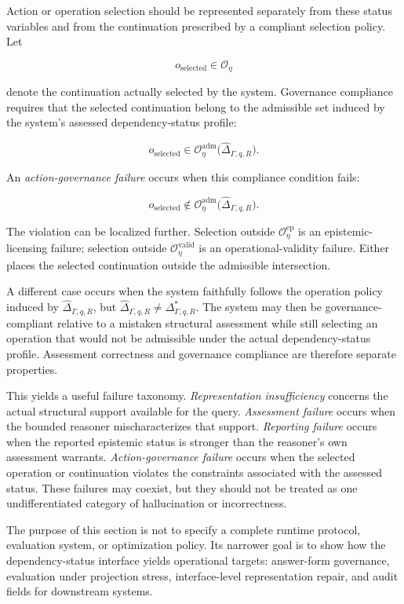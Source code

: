 \documentclass[11pt]{article}
\theoremstyle{definition}
\theoremstyle{remark}
\begin{document}
Action or operation selection should be represented separately from these status variables and from the continuation prescribed by a compliant selection policy. Let

\[
o_{\mathrm{selected}}\in\mathcal O_{\eta}
\]

denote the continuation actually selected by the system. Governance compliance requires that the selected continuation belong to the admissible set induced by the system's assessed dependency-status profile:

\[
o_{\mathrm{selected}}
\in
\mathcal O^{\mathrm{adm}}_{\eta}
\bigl(\widehat{\Delta}_{\Gamma,q,R}\bigr).
\]

An \emph{action-governance failure} occurs when this compliance condition fails:

\[
o_{\mathrm{selected}}
\notin
\mathcal O^{\mathrm{adm}}_{\eta}
\bigl(\widehat{\Delta}_{\Gamma,q,R}\bigr).
\]

The violation can be localized further. Selection outside \(\mathcal O^{\mathrm{ep}}_{\eta}\) is an epistemic-licensing failure; selection outside \(\mathcal O^{\mathrm{valid}}_{\eta}\) is an operational-validity failure. Either places the selected continuation outside the admissible intersection.

A different case occurs when the system faithfully follows the operation policy induced by \(\widehat{\Delta}_{\Gamma,q,R}\), but \(\widehat{\Delta}_{\Gamma,q,R}\neq\Delta^{*}_{\Gamma,q,R}\). The system may then be governance-compliant relative to a mistaken structural assessment while still selecting an operation that would not be admissible under the actual dependency-status profile. Assessment correctness and governance compliance are therefore separate properties.

This yields a useful failure taxonomy. \emph{Representation insufficiency} concerns the actual structural support available for the query. \emph{Assessment failure} occurs when the bounded reasoner mischaracterizes that support. \emph{Reporting failure} occurs when the reported epistemic status is stronger than the reasoner's own assessment warrants. \emph{Action-governance failure} occurs when the selected operation or continuation violates the constraints associated with the assessed status. These failures may coexist, but they should not be treated as one undifferentiated category of hallucination or incorrectness.

The purpose of this section is not to specify a complete runtime protocol, evaluation system, or optimization policy. Its narrower goal is to show how the dependency-status interface yields operational targets: answer-form governance, evaluation under projection stress, interface-level representation repair, and audit fields for downstream systems.
\end{document}
